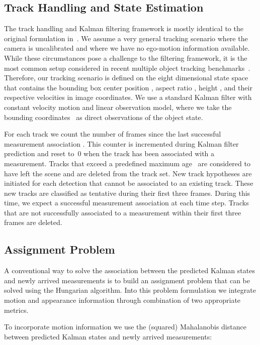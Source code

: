 \documentclass{article}
\begin{document}
\subsection{Track Handling and State Estimation}

The track handling and Kalman filtering framework is mostly identical to the
original formulation in~\cite{Bewley2016_sort}.
We assume a very general tracking scenario where the camera is uncalibrated
and where we have no ego-motion information available.
While these circumstances pose a challenge to the filtering framework,
it is the most common setup considered in recent multiple object tracking
benchmarks~\cite{milan2016mot16}.
Therefore, our tracking scenario is defined on the eight dimensional
state space~
that contains the bounding box center position , aspect ratio ,
height , and their respective velocities in image coordinates.
We use a standard Kalman filter with constant velocity motion and linear
observation model, where we take the bounding
coordinates~ as direct observations of the
object state.

For each track  we count the number of frames since the last successful
measurement association . This counter is incremented during Kalman filter
prediction and reset to~0 when the track has been associated with a measurement.
Tracks that exceed a predefined maximum age~ are considered to
have left the scene and are deleted from the track set.
New track hypotheses are initiated for each detection that cannot be associated
to an existing track.
These new tracks are classified as tentative during their first three frames.
During this time, we expect a successful measurement association at each time
step.  Tracks that are not successfully associated to a measurement within their first
three frames are deleted.

\subsection{Assignment Problem}

A conventional way to solve the association between the
predicted Kalman states and newly arrived measurements is to build an
assignment problem that can be solved using the Hungarian algorithm.
Into this problem formulation we integrate motion and appearance information
through combination of two appropriate metrics.

To incorporate motion information we use the (squared) Mahalanobis distance
between predicted Kalman states and newly arrived measurements:
\end{document}
